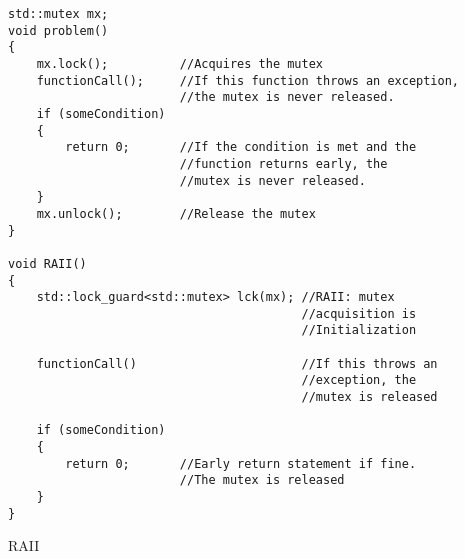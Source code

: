 \documentclass{article}
\begin{document}
\begin{listing}[ht]
\begin{verbatim}
std::mutex mx;
void problem()
{
    mx.lock();          //Acquires the mutex
    functionCall();     //If this function throws an exception,
                        //the mutex is never released.
    if (someCondition)
    {
        return 0;       //If the condition is met and the
                        //function returns early, the
                        //mutex is never released.
    }
    mx.unlock();        //Release the mutex
}

void RAII()
{
    std::lock_guard<std::mutex> lck(mx); //RAII: mutex
                                         //acquisition is
                                         //Initialization
    
    functionCall()                       //If this throws an 
                                         //exception, the 
                                         //mutex is released
    
    if (someCondition)
    {
        return 0;       //Early return statement if fine.
                        //The mutex is released
    }
}
\end{verbatim}
\caption{RAII}
\end{listing}
\end{document}
